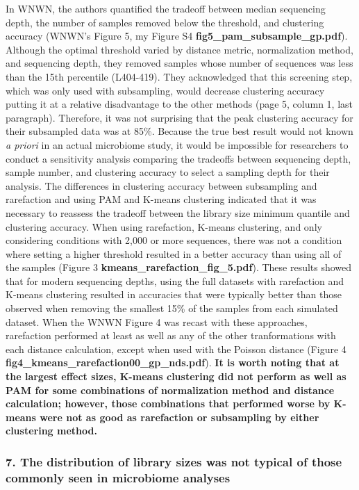 \documentclass[
]{article}
\begin{document}
In WNWN, the authors quantified the tradeoff between median sequencing
depth, the number of samples removed below the threshold, and clustering
accuracy (WNWN's Figure 5, my Figure S4
\textbf{fig5\_pam\_subsample\_gp.pdf}). Although the optimal threshold
varied by distance metric, normalization method, and sequencing depth,
they removed samples whose number of sequences was less than the 15th
percentile (L404-419). They acknowledged that this screening step, which
was only used with subsampling, would decrease clustering accuracy
putting it at a relative disadvantage to the other methods (page 5,
column 1, last paragraph). Therefore, it was not surprising that the
peak clustering accuracy for their subsampled data was at 85\%. Because
the true best result would not known \emph{a priori} in an actual
microbiome study, it would be impossible for researchers to conduct a
sensitivity analysis comparing the tradeoffs between sequencing depth,
sample number, and clustering accuracy to select a sampling depth for
their analysis. The differences in clustering accuracy between
subsampling and rarefaction and using PAM and K-means clustering
indicated that it was necessary to reassess the tradeoff between the
library size minimum quantile and clustering accuracy. When using
rarefaction, K-means clustering, and only considering conditions with
2,000 or more sequences, there was not a condition where setting a
higher threshold resulted in a better accuracy than using all of the
samples (Figure 3 \textbf{kmeans\_rarefaction\_fig\_5.pdf}). These
results showed that for modern sequencing depths, using the full
datasets with rarefaction and K-means clustering resulted in accuracies
that were typically better than those observed when removing the
smallest 15\% of the samples from each simulated dataset. When the WNWN
Figure 4 was recast with these approaches, rarefaction performed at
least as well as any of the other tranformations with each distance
calculation, except when used with the Poisson distance (Figure 4
\textbf{fig4\_kmeans\_rarefaction00\_gp\_nds.pdf}). \textbf{It is worth
noting that at the largest effect sizes, K-means clustering did not
perform as well as PAM for some combinations of normalization method and
distance calculation; however, those combinations that performed worse
by K-means were not as good as rarefaction or subsampling by either
clustering method.}

\hypertarget{the-distribution-of-library-sizes-was-not-typical-of-those-commonly-seen-in-microbiome-analyses}{%
\subsubsection{7. The distribution of library sizes was not typical of
those commonly seen in microbiome
analyses}\label{the-distribution-of-library-sizes-was-not-typical-of-those-commonly-seen-in-microbiome-analyses}}
\end{document}
